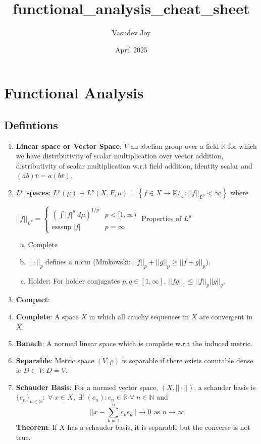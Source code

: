 \documentclass{article}
\title{functional_analysis_cheat_sheet}
\author{Vasudev Joy}
\date{April 2025}
\begin{document}
\section*{Functional Analysis}

\subsection*{Defintions}

\begin{enumerate}
    \item \textbf{Linear space or Vector Space}: \(V\) an abelian group over a field \(\mathbb{K}\) for which we have distributivity of scalar multiplication over vector addition, distributivity of scalar multiplication w.r.t field addition, identity scalar and \((ab)\bar v = a(b \bar v)\). 

    \item \textbf{$L^p$ spaces}: \(L^p(\mu)\equiv L^p(X, F, \mu) = \left\{f \in X \to \overline{\mathbb{K}} /_\sim :||f||_ {L^p} < \infty\right\}\) where 
    
    \(||f||_{L^p} = \begin{cases}
        (\int|f|^p \;d\mu)^{1/p} & p < [1,\infty) \\
        \text{esssup} \; |f| & p =\infty
    \end{cases}
    \)
    Properties of \(L^p\)
    \begin{enumerate} [a.]
        \item Complete
        \item \(||\cdot ||_p\) defines a norm (Minkowski: \(||f||_p + ||g||_p \geq ||f + g||_p\)).
        \item Holder: For holder conjugates \(p, q \in [1,\infty]\), \(||fg||_1 \leq ||f||_p||g||_q\).
    \end{enumerate}
    \item \textbf{Compact}: 
    \item \textbf{Complete}: A space \(X\) in which all cauchy sequences in \(X\) are convergent in \(X\).
    \item \textbf{Banach}: A normed linear space which is complete w.r.t the induced metric.
    \item \textbf{Separable}: Metric space \((V, \rho)\) is separable if there exists countable dense ie \(D \subset V: \overline{D} = V\).
    \item \textbf{Schauder Basis:} For a normed vector space, \((X, || \cdot||)\), a schauder basis is \(\{e_n\}_{n \in \mathbb{N}}: \; \forall \; x \in X, \; \exists! \; (c_n): c_n \in \mathbb{R} \; \forall \; n \in \mathbb{N}\) and
    \[
    ||x - \sum_{k = 1}^n c_ke_k|| \to 0 \text{ as } n \to \infty
    \]
    \textbf{Theorem}: If \(X\) has a schauder basis, it is separable but the converse is not true.


\end{enumerate}
\end{document}
